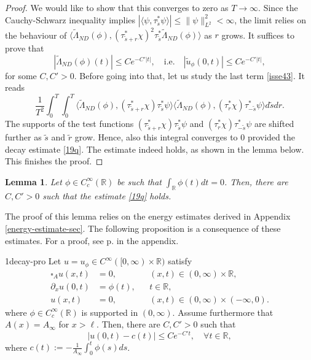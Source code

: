 \documentclass[10pt,a4paper]{article}
\theoremstyle{plain}
\newtheorem{lemma}[theorem]{Lemma}
\newtheorem{proposition}[theorem]{Proposition}
\theoremstyle{definition}
\theoremstyle{remark}
\numberwithin{equation}{section}
\newcommand{\R}{\mathbb{R}}
\begin{document}
\begin{proof}
 We would like to show that this converges to zero as $T \to \infty$. 
Since the Cauchy-Schwarz inequality implies $| \langle  \psi ,   \tau_{\tilde{s}}^*\psi  \rangle|  \leq \| \psi \|^2_{L^2} < \infty$, the limit relies on the behaviour of  $ \langle   \tilde\Lambda_{ND} (\phi ),  (\tau_{{\tilde{s}+r}}^*\chi )^2  \tau_{{\tilde{s}}}^*\tilde\Lambda_{ND} (\phi )   \rangle $ as $r $ grows. 
It suffices to prove that 
\begin{equation}\label{19q}
|  \tilde\Lambda_{ND} (\phi)(t) | \leq C e^{-C'|t|}  , \quad \text{i.e.}  \quad |  \tilde{u}_\phi  (0,t)  | \leq C e^{-C'|t|}  , 
\end{equation}
 for some $C,C'>0$. 
Before going into that, let us study the last term \eqref{isse43}. It reads
\[
 \frac{1}{T^2} \int_0^T \int_0^T\langle  \tilde\Lambda_{ND} (\phi  ),  ( \tau_{\tilde{s}+r}^* \chi  ) \tau_{\tilde{s}}^* \psi  \rangle \langle   \tilde\Lambda_{ND} (\phi ), (\tau_r^* \chi )  \tau_{-\tilde{s}}^* \psi   \rangle d \tilde{s} dr.
\]
The supports of the test functions $ ( \tau_{\tilde{s}+r}^* \chi  ) \tau_{\tilde{s}}^* \psi  $ and  $(\tau_r^* \chi )  \tau_{-\tilde{s}}^* \psi  $  are shifted further as $\tilde{s}$ and $\tilde{r}$ grow. 
Hence, also this integral converges to $0$ provided the decay estimate \eqref{19q}. 
The estimate indeed holds, as shown in the lemma below. This finishes the proof. 
\end{proof}

\begin{lemma}\label{K-lemma}
Let $\phi \in C^\infty_c(\R)$ be such that $ \int_{\R} \phi (t) dt = 0$. Then, there are $C,C'>0$ such that the estimate \eqref{19q} holds.
\end{lemma} 

{The proof of this lemma relies on the energy estimates derived in Appendix  \ref{energy-estimate-sec}. The following proposition is a consequence of these estimates. For a proof, see p. \pageref{1decay-pro} in the appendix. 

\begin{repproposition}{1decay-pro}
  Let $u = u_\phi  \in C^\infty( [0,\infty) \times \R)  $ satisfy 
  \begin{align}
    \square_A u(x,t) &= 0, &&   (x,t) \in (0,\infty) \times \R,\\
    \partial_x u (0,t) &= \phi(t), && t\in\R,\\
    u(x,t) &= 0, && (x,t) \in (0,\infty) \times (-\infty,0).
  \end{align}
  where $\phi \in C^{\infty}_c (\R)$ is supported in $(0,\infty)$. Assume furthermore that $A(x)=A_\infty$ for $x > \ell$. Then, there are $C,C'>0$ such that 
 \[
    \big|  u(0,t) -c(t)  \big| \leq C e^{-C't}, \quad \forall t \in \R, 
    \]
    where  $c(t) := - \frac{1}{A_\infty} \int_0^t \phi(s) ds$. 
\end{repproposition}
}
\end{document}
